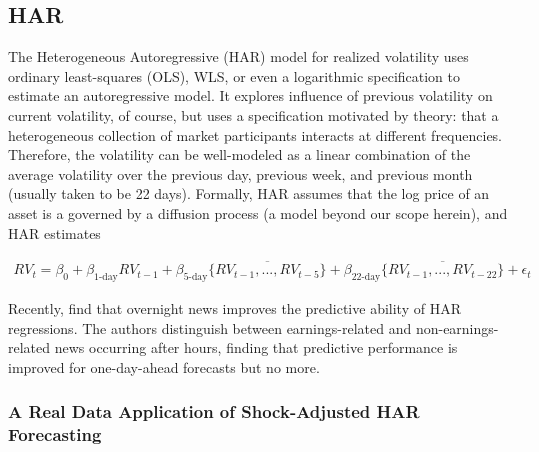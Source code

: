 \documentclass[11pt]{article}
\theoremstyle{definition}
\begin{document}
\subsection{HAR}

The Heterogeneous Autoregressive (HAR) model for realized volatility \citep{corsi2009simple}  uses ordinary least-squares (OLS), WLS, or even a logarithmic specification to estimate an autoregressive model.  It explores influence of previous volatility on current volatility, of course, but uses a specification motivated by theory: that a heterogeneous collection of market participants interacts at different frequencies.  Therefore, the volatility can be well-modeled as a linear combination of the average volatility over the previous day, previous week, and previous month (usually taken to be 22 days).  Formally, HAR assumes that the log price of an asset is a governed by a diffusion process (a model beyond our scope herein), and HAR estimates

\begin{align*}
RV_{t} = \beta_{0} + \beta_{\text{1-day}}RV_{t-1} + \beta_{\text{5-day}}\overline{\{RV_{t-1},...,RV_{t-5}\}}+\beta_{\text{22-day}}\overline{\{RV_{t-1},...,RV_{t-22}\}} + \epsilon_{t}
\end{align*}

Recently, \cite{bodilsen2023exploiting} find that overnight news improves the predictive ability of HAR regressions.  The authors distinguish between earnings-related and non-earnings-related news occurring after hours, finding that predictive performance is improved for one-day-ahead forecasts but no more.

\subsubsection{A Real Data Application of Shock-Adjusted HAR Forecasting}
\end{document}
